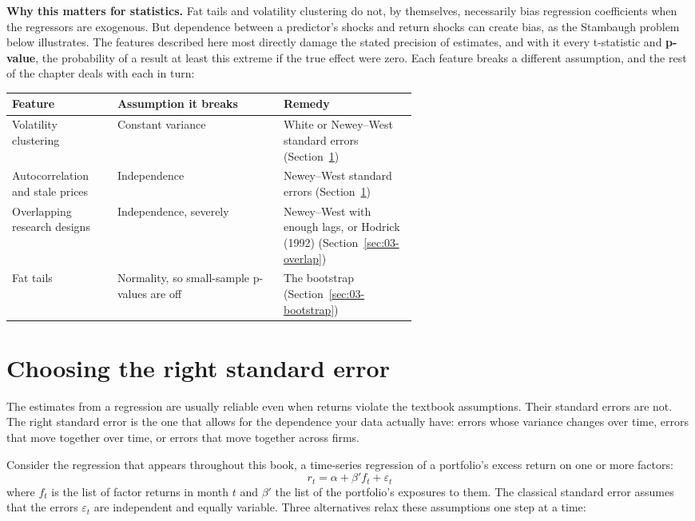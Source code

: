 \textbf{Why this matters for statistics.} Fat tails and volatility clustering do not, by themselves, necessarily bias regression coefficients when the regressors are exogenous. But dependence between a predictor's shocks and return shocks can create bias, as the Stambaugh problem below illustrates. The features described here most directly damage the stated precision of estimates, and with it every
t-statistic and \textbf{p-value}, the probability of a result at least this
extreme if the true effect were zero. Each feature breaks a
different assumption, and the rest of the chapter deals with each in turn:

\begin{center}
\small
\begin{tabularx}{0.95\linewidth}{@{}>{\raggedright\arraybackslash}p{0.26\linewidth}>{\raggedright\arraybackslash}X>{\raggedright\arraybackslash}p{0.33\linewidth}@{}}
\toprule
Feature & Assumption it breaks & Remedy \\
\midrule
Volatility clustering & Constant variance & White or Newey--West standard errors (Section~\ref{sec:03-se}) \\
Autocorrelation and stale prices & Independence & Newey--West standard errors (Section~\ref{sec:03-se}) \\
Overlapping research designs & Independence, severely & Newey--West with enough lags, or Hodrick (1992) (Section~\ref{sec:03-overlap}) \\
Fat tails & Normality, so small-sample p-values are off & The bootstrap (Section~\ref{sec:03-bootstrap}) \\
\bottomrule
\end{tabularx}
\end{center}

\section{Choosing the right standard error}
\label{sec:03-se}

The estimates from a regression are usually reliable even when returns violate
the textbook assumptions. Their standard errors are not. The right standard
error is the one that allows for the dependence your data actually have: errors
whose variance changes over time, errors that move together over time, or
errors that move together across firms.

Consider the regression that appears throughout this book, a time-series
regression of a portfolio's excess return on one or more factors:
\begin{equation}
  r_t = \alpha + \beta' f_t + \varepsilon_t
  \label{eq:03-ts}
\end{equation}
where $f_t$ is the list of factor returns in month $t$ and $\beta'$ the list of
the portfolio's exposures to them. The classical standard error assumes that
the errors $\varepsilon_t$ are independent and equally variable. Three
alternatives relax these assumptions one step at a time:

